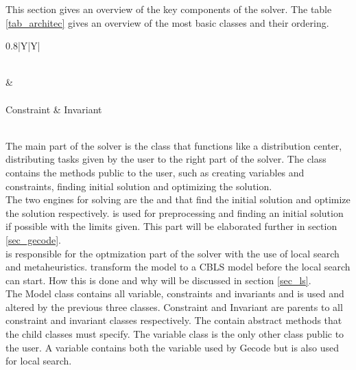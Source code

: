 This section gives an overview of the key components of the solver. The table \ref{tab_architec} gives an overview 
of the most 
basic classes and their ordering. \\ 
\begin{table}[b]
\Large
\def\arraystretch{1.5}
\centering
\label{keyStruc}
\begin{tabularx}{0.8\textwidth}{|Y|Y|}%

\hline
{}  \\ \hline
\gecodesol      & \lssol       \\ \hline
{}    \\ \hline
Constraint      & Invariant    \\ \hline
{} \\ \hline
\end{tabularx}\caption{Ordering of key classes} \label{tab_architec}
\end{table}
\noindent
The main part of the solver is the \gensol class that functions like a distribution center, distributing tasks given 
by the user to the right part of the solver. The \gensol class contains 
the methods public to the user, such as creating variables and constraints, finding initial solution and optimizing the 
solution. \\ 
The two engines for solving are the \gecodesol and \lssol that find the initial solution and optimize the solution 
respectively. \gecodesol is used for preprocessing and finding an initial solution if possible with the limits given. 
This part will be elaborated further in section \ref{sec_gecode}. \\
\lssol is responsible for the optmization part of the solver with the use of local search and metaheuristics. \lssol 
transform the model to a CBLS model before the local search can start. How this is done and why will be discussed in 
section \ref{sec_ls}. \\ 
The Model class contains all variable, constraints and invariants and is used and altered by the previous three 
classes. Constraint and Invariant are parents to all constraint and invariant classes respectively. The contain 
abstract methods that the child classes must specify. The variable class is the only other class public to the user. A 
variable contains both the variable used by Gecode but is also used for local search. \\



